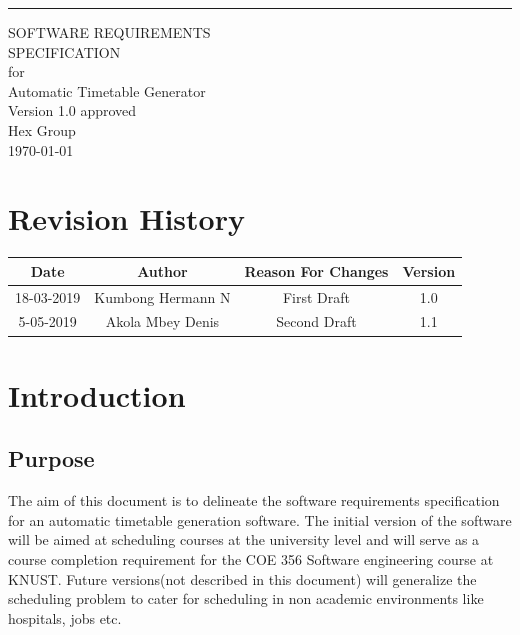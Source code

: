 \documentclass{scrreprt}
\date{}
\def\myversion{1.0 }
\begin{document}
\begin{flushright}
    \rule{16cm}{5pt}\vskip1cm
    \begin{bfseries}
        \Huge{SOFTWARE REQUIREMENTS\\ SPECIFICATION}\\
        \vspace{1.9cm}
        for\\
        \vspace{1.9cm}
        Automatic Timetable Generator\\
        \vspace{1.9cm}
        \LARGE{Version \myversion approved}\\
        \vspace{1.9cm}
        \vspace{1.9cm}
        Hex Group\\
        \vspace{1.9cm}
        \today\\
    \end{bfseries}
\end{flushright}

\tableofcontents


\chapter*{Revision History}

\begin{center}
    \begin{tabular}{|c|c|c|c|}
        \hline
	    Date & Author & Reason For Changes & Version\\
        \hline
	     18-03-2019& Kumbong Hermann N & First Draft & 1.0\\
        \hline
	   5-05-2019  &  Akola Mbey Denis & Second Draft &1.1 \\
        \hline
    \end{tabular}
\end{center}

\chapter{Introduction}

\section{Purpose}
The aim of this document is to delineate the software requirements specification for an automatic timetable generation software. The initial version of the software will be aimed at scheduling courses  at the university level and will serve as a course completion requirement for the COE 356 Software engineering course at KNUST. Future versions(not described in this document) will generalize the scheduling problem to cater for scheduling in non academic environments like hospitals, jobs etc.
\end{document}

